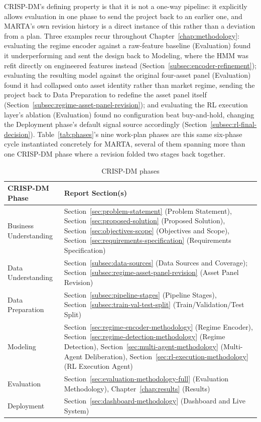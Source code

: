 CRISP-DM's defining property is that it is not a one-way pipeline: it explicitly allows evaluation in one phase to send the project back to an earlier one, and MARTA's own revision history is a direct instance of this rather than a deviation from a plan. Three examples recur throughout Chapter~\ref{chap:methodology}: evaluating the regime encoder against a raw-feature baseline (Evaluation) found it underperforming and sent the design back to Modeling, where the HMM was refit directly on engineered features instead (Section~\ref{subsec:encoder-refinement}); evaluating the resulting model against the original four-asset panel (Evaluation) found it had collapsed onto asset identity rather than market regime, sending the project back to Data Preparation to redefine the asset panel itself (Section~\ref{subsec:regime-asset-panel-revision}); and evaluating the RL execution layer's ablation (Evaluation) found no configuration beat buy-and-hold, changing the Deployment phase's default signal source accordingly (Section~\ref{subsec:rl-final-decision}). Table~\ref{tab:phases}'s nine work-plan phases are this same six-phase cycle instantiated concretely for MARTA, several of them spanning more than one CRISP-DM phase where a revision folded two stages back together.

\begin{table}[H]
\centering
\small
\caption{CRISP-DM phases}
\label{tab:crispdm-mapping}
\begin{tabular}{|l|p{9.5cm}|}
\hline
\textbf{CRISP-DM Phase} & \textbf{Report Section(s)} \\
\hline
Business Understanding & Section~\ref{sec:problem-statement} (Problem Statement), Section~\ref{sec:proposed-solution} (Proposed Solution), Section~\ref{sec:objectives-scope} (Objectives and Scope), Section~\ref{sec:requirements-specification} (Requirements Specification) \\
\hline
Data Understanding & Section~\ref{subsec:data-sources} (Data Sources and Coverage); Section~\ref{subsec:regime-asset-panel-revision} (Asset Panel Revision) \\
\hline
Data Preparation & Section~\ref{subsec:pipeline-stages} (Pipeline Stages), Section~\ref{subsec:train-val-test-split} (Train/Validation/Test Split) \\
\hline
Modeling & Section~\ref{sec:regime-encoder-methodology} (Regime Encoder), Section~\ref{sec:regime-detection-methodology} (Regime Detection), Section~\ref{sec:multi-agent-methodology} (Multi-Agent Deliberation), Section~\ref{sec:rl-execution-methodology} (RL Execution Agent) \\
\hline
Evaluation & Section~\ref{sec:evaluation-methodology-full} (Evaluation Methodology), Chapter~\ref{chap:results} (Results) \\
\hline
Deployment & Section~\ref{sec:dashboard-methodology} (Dashboard and Live System) \\
\hline
\end{tabular}
\normalsize
\end{table}

